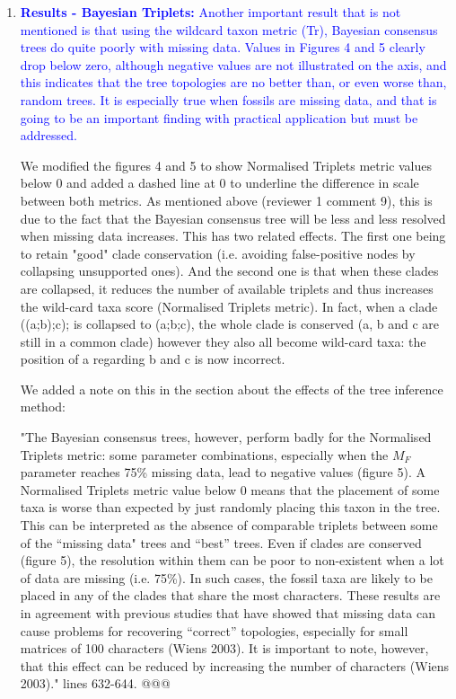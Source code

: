 \documentclass[12pt,letterpaper]{article}
\begin{document}
\begin{enumerate}
\item{\textcolor{blue}{\textbf{Results - Bayesian Triplets:} Another important result that is not mentioned is that using the wildcard taxon metric (Tr), Bayesian consensus trees do quite poorly with missing data.
Values in Figures 4 and 5 clearly drop below zero, although negative values are not illustrated on the axis, and this indicates that the tree topologies are no better than, or even worse than, random trees.
It is especially true when fossils are missing data, and that is going to be an important finding with practical application but must be addressed. }}

We modified the figures 4 and 5 to show Normalised Triplets metric values below 0 and added a dashed line at 0 to underline the difference in scale between both metrics.
As mentioned above (reviewer 1 comment 9), this is due to the fact that the Bayesian consensus tree will be less and less resolved when missing data increases.
This has two related effects.
The first one being to retain "good" clade conservation (i.e. avoiding false-positive nodes by collapsing unsupported ones).
And the second one is that when these clades are collapsed, it reduces the number of available triplets and thus increases the wild-card taxa score (Normalised Triplets metric).
In fact, when a clade ((a;b);c); is collapsed to (a;b;c), the whole clade is conserved (a, b and c are still in a common clade) however they also all become wild-card taxa: the position of a regarding b and c is now incorrect.

We added a note on this in the section about the effects of the tree inference method:

"The Bayesian consensus trees, however, perform badly for the Normalised Triplets metric: some parameter combinations, especially when the $M_F$ parameter reaches 75\% missing data, lead to negative values (figure 5).
A Normalised Triplets metric value below 0 means that the placement of some taxa is worse than expected by just randomly placing this taxon in the tree.
This can be interpreted as the absence of comparable triplets between some of the ``missing data" trees and ``best'' trees.
Even if clades are conserved (figure 5), the resolution within them can be poor to non-existent when a lot of data are missing (i.e. 75\%).
In such cases, the fossil taxa are likely to be placed in any of the clades that share the most characters.
These results are in agreement with previous studies that have showed that missing data can cause problems for recovering ``correct'' topologies, especially for small matrices of 100 characters (Wiens 2003).
It is important to note, however, that this effect can be reduced by increasing the number of characters (Wiens 2003)." lines 632-644. @@@


\end{enumerate}
\end{document}

